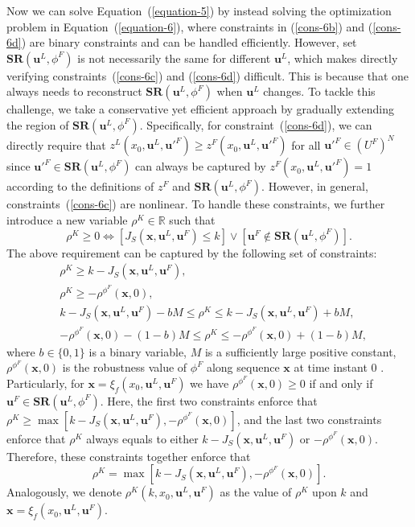 \documentclass[letterpaper, 10 pt, conference]{ieeeconf}
\begin{document}
Now we can solve Equation~(\ref{equation-5}) by instead solving the optimization problem in Equation~(\ref{equation-6}), where constraints in (\ref{cons-6b}) and (\ref{cons-6d}) are binary constraints and can be handled efficiently.
However, set $\mathbf{SR}(\mathbf{u}^L, \phi^F)$ is not necessarily the same for different $\mathbf{u}^L$, which makes directly verifying constraints~(\ref{cons-6c}) and 
(\ref{cons-6d}) difficult. This is because that one always needs to reconstruct $\mathbf{SR}(\mathbf{u}^L, \phi^F)$ when $\mathbf{u}^L$ changes.
To tackle this challenge, 
we take a conservative yet efficient approach by gradually extending the 
region of  $\mathbf{SR}(\mathbf{u}^L, \phi^F)$.
Specifically, for constraint~(\ref{cons-6d}), we can directly require that $z^L(x_0,\mathbf{u}^L,\mathbf{u}'^F)\geq z^F(x_0,\mathbf{u}^L,\mathbf{u}'^F)$ for all $\mathbf{u}'^F\in (U^F)^N$ since $\mathbf{u}'^F\in \mathbf{SR}(\mathbf{u}^L, \phi^F)$ can always be captured by $z^F(x_0,\mathbf{u}^L,\mathbf{u}'^F)=1$ according to the definitions of $z^F$ and $\mathbf{SR}(\mathbf{u}^L, \phi^F)$.
However, in general, constraints~(\ref{cons-6c}) are nonlinear. To handle these constraints, we further introduce a new variable $\rho^K\in \mathbb{R}$ such that
\[
\rho^K\geq 0 \Leftrightarrow [J_S(\mathbf{x}, \mathbf{u}^L,\mathbf{u}^F)\leq k]\vee[\mathbf{u}^F\not\in \mathbf{SR}(\mathbf{u}^L, \phi^F)].
\]
The above requirement can be captured by the following set of constraints:
\begin{subequations}
    \begin{align}
        & \rho^K\geq k-J_S(\mathbf{x}, \mathbf{u}^L,\mathbf{u}^F), \nonumber \\
        & \rho^K\geq -\rho^{\phi^F} (\mathbf{x},0), \nonumber \\
        & k\!-\!J_S(\mathbf{x}, \mathbf{u}^L,\mathbf{u}^F)-bM \leq\! \rho^K \!\leq k\!-\!J_S(\mathbf{x}, \mathbf{u}^L,\mathbf{u}^F)+bM, \nonumber \\
        & -\rho^{\phi^F}(\mathbf{x},0)-(1-b)M\leq \rho^K \leq -\rho^{\phi^F}(\mathbf{x},0)+(1-b)M, \nonumber
    \end{align}
\end{subequations}
where $b\in \{0,1\}$ is a binary variable, $M$ is a sufficiently large positive constant, $\rho^{\phi^F}(\mathbf{x},0)$ is the robustness value of $\phi^F$ along sequence $\mathbf{x}$ at time instant $0$ \cite{donze2010robust}. Particularly, for $\mathbf{x}=\xi_f(x_0,\mathbf{u}^L,\mathbf{u}^F)$ we have $\rho^{\phi^F}(\mathbf{x},0)\geq 0$ if and only if $\mathbf{u}^F\in \mathbf{SR}(\mathbf{u}^L, \phi^F)$.
Here, the first two constraints enforce that $\rho^K\geq\max[k-J_S(\mathbf{x}, \mathbf{u}^L,\mathbf{u}^F), -\rho^{\phi^F}(\mathbf{x},0)]$, and the last two constraints enforce that $\rho^K$ always equals to either $k-J_S(\mathbf{x}, \mathbf{u}^L,\mathbf{u}^F)$ or $ -\rho^{\phi^F}(\mathbf{x},0)$. 
Therefore, these constraints together enforce that
\begin{equation}
\rho^K=\max[k-J_S(\mathbf{x}, \mathbf{u}^L,\mathbf{u}^F), -\rho^{\phi^F}(\mathbf{x},0)].
\end{equation}
Analogously, we denote $\rho^K(k,x_0,\mathbf{u}^L,\mathbf{u}^F)$ as the value of $\rho^K$ upon $k$ and $\mathbf{x}=\xi_f(x_0,\mathbf{u}^L,\mathbf{u}^F)$.
\end{document}
